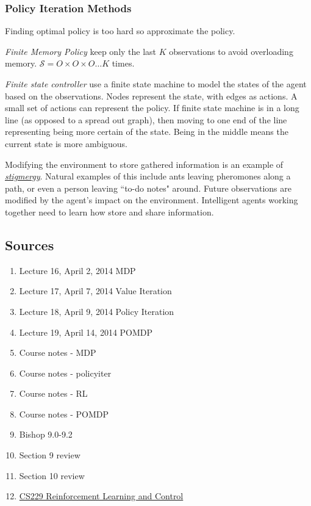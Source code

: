 \documentclass[11pt, oneside]{article}   	%
\begin{document}
\subsubsection{Policy Iteration Methods}

Finding optimal policy is too hard so approximate the policy. 

\emph{Finite Memory Policy} keep only the last $K$ observations to avoid overloading memory. $\mathcal{S} = O \times O \times O \hdots K$ times.

\emph{Finite state controller} use a finite state machine to model the states of the agent based on the observations. Nodes represent the state, with edges as actions. A small set of actions can represent the policy. If finite state machine is in a long line (as opposed to a spread out graph), then moving to one end of the line representing being more certain of the state. Being in the middle means the current state is more ambiguous.

Modifying the environment to store gathered information is an example of \href{http://en.wikipedia.org/wiki/Stigmergy}{\emph{stigmergy}}. Natural examples of this include ants leaving pheromones along a path, or even a person leaving ``to-do notes" around. Future observations are modified by the agent's impact on the environment. Intelligent agents working together need to learn how store and share information.

\subsection{Sources}

\begin{enumerate}
	\item Lecture 16, April 2, 2014 MDP
	\item Lecture 17, April 7, 2014 Value Iteration
	\item Lecture 18, April 9, 2014 Policy Iteration
	\item Lecture 19, April 14, 2014 POMDP
	\item Course notes - MDP
	\item Course notes - policyiter
	\item Course notes - RL
	\item Course notes - POMDP
	\item Bishop 9.0-9.2
	\item Section 9 review
	\item Section 10 review
	\item \href{http://cs229.stanford.edu/notes/cs229-notes12.pdf}{CS229 Reinforcement Learning and Control}
\end{enumerate}
\end{document}
